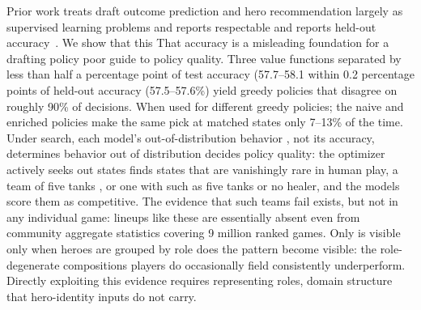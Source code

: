 \documentclass[journal]{IEEEtran}
\providecommand{\DIFaddtex}[1]{{\protect\color{blue} \sf #1}} %
\providecommand{\DIFdeltex}[1]{{\protect\color{red} \scriptsize #1}} %
\providecommand{\DIFaddbegin}{} %
\providecommand{\DIFaddend}{} %
\providecommand{\DIFdelbegin}{} %
\providecommand{\DIFdelend}{} %
\providecommand{\DIFadd}[1]{\texorpdfstring{\DIFaddtex{#1}}{#1}} %
\providecommand{\DIFdel}[1]{\texorpdfstring{\DIFdeltex{#1}}{}} %
\begin{document}
\DIFadd{Prior work treats }\DIFaddend draft outcome prediction and hero recommendation \DIFdelbegin \DIFdel{largely }\DIFdelend as supervised learning \DIFdelbegin \DIFdel{problems and reports respectable }\DIFdelend \DIFaddbegin \DIFadd{and reports }\DIFaddend held-out accuracy~\cite{chen2018drafting,gourdeau2021discriminative,summerville2016draft,lee2022draftrec}. \DIFdelbegin \DIFdel{We show that this }\DIFdelend \DIFaddbegin \DIFadd{That }\DIFaddend accuracy is a \DIFdelbegin \DIFdel{misleading foundation for a drafting policy }\DIFdelend \DIFaddbegin \DIFadd{poor guide to policy quality}\DIFaddend . Three value functions \DIFdelbegin \DIFdel{separated by less than half a percentage point of test accuracy (57.7--58.1}\DIFdelend \DIFaddbegin \DIFadd{within 0.2 percentage points of held-out accuracy (57.5--57.6}\DIFaddend \%) yield \DIFdelbegin \DIFdel{greedy policies that disagree on roughly 90\% of decisions. When used for }\DIFdelend \DIFaddbegin \DIFadd{different greedy policies; the naive and enriched policies make the same pick at matched states only 7--13\% of the time. Under }\DIFaddend search, each model's \DIFdelbegin \DIFdel{out-of-distribution behavior , not its accuracy, determines }\DIFdelend \DIFaddbegin \DIFadd{behavior out of distribution decides }\DIFaddend policy quality: the optimizer \DIFdelbegin \DIFdel{actively seeks out states }\DIFdelend \DIFaddbegin \DIFadd{finds states that are }\DIFaddend vanishingly rare in human play, \DIFdelbegin \DIFdel{a team of five tanks , or one with }\DIFdelend \DIFaddbegin \DIFadd{such as five tanks or }\DIFaddend no healer, and the models score them as competitive. The evidence that such teams fail \DIFdelbegin \DIFdel{exists, but not in any individual game: lineups like these are essentially absent even from community aggregate statistics covering 9 million ranked games. Only }\DIFdelend \DIFaddbegin \DIFadd{is visible only }\DIFaddend when heroes are grouped by role\DIFdelbegin \DIFdel{does the pattern become visible}\DIFdelend : the role-degenerate compositions players \DIFdelbegin \DIFdel{do }\DIFdelend occasionally field consistently underperform.
\DIFdelbegin \DIFdel{Directly exploiting this evidence requires representing roles, domain structure that hero-identity inputs do not carry.
}\DIFdelend 
\end{document}

